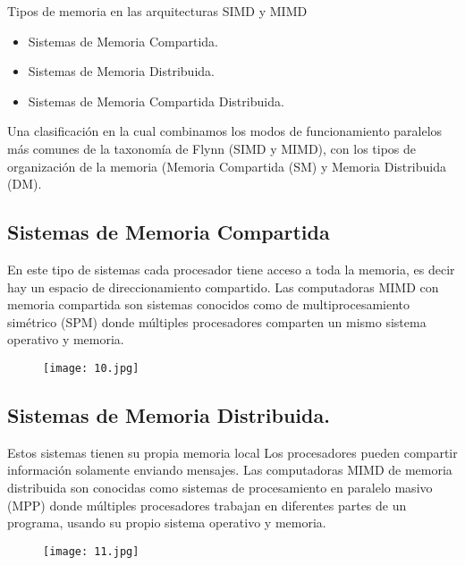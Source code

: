 {\raggedright
Tipos de memoria en las arquitecturas SIMD y MIMD
}

\begin{itemize}
	\item Sistemas de Memoria Compartida.
	\item Sistemas de Memoria Distribuida.
	\item Sistemas de Memoria Compartida Distribuida.
\end{itemize}

Una clasificación en la cual combinamos los modos de funcionamiento paralelos más comunes de la taxonomía de Flynn (SIMD y MIMD), con los tipos de organización de la memoria (Memoria Compartida (SM) y Memoria Distribuida (DM).

\begin{center}
\subsection{Sistemas de Memoria Compartida}
\end{center}

En este tipo de sistemas cada procesador tiene acceso a toda la memoria, es decir hay un
espacio de direccionamiento compartido. Las computadoras MIMD con memoria compartida son sistemas conocidos como de multiprocesamiento simétrico (SPM) donde múltiples procesadores comparten un mismo sistema operativo y memoria.

\begin{figure}[h!]
		\centering
		{\texttt{[image: 10.jpg]}\par} \vspace{1cm}
\end{figure}

\begin{center}
\subsection{Sistemas de Memoria Distribuida.}
\end{center}

Estos sistemas tienen su propia memoria local Los procesadores pueden compartir información solamente enviando mensajes. Las computadoras MIMD de memoria distribuida son conocidas como sistemas de procesamiento en paralelo masivo (MPP) donde múltiples procesadores trabajan en diferentes partes de un programa, usando su propio sistema operativo y memoria.

\begin{figure}[h!]
		\centering
		{\texttt{[image: 11.jpg]}\par} \vspace{1cm}
\end{figure}

